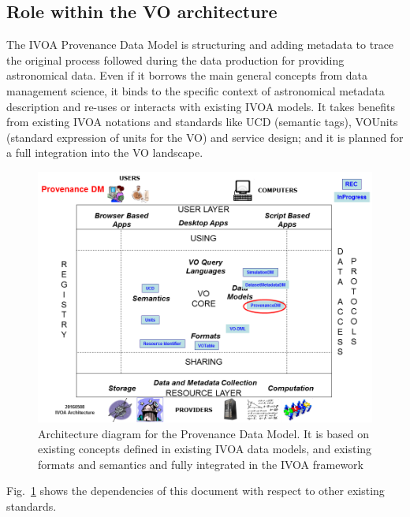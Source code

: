 \subsection{Role within the VO architecture}

The IVOA Provenance Data Model is structuring and adding metadata to trace the original process followed during the data production for providing astronomical data. Even if it borrows the main general concepts from data management science, it binds to the specific context of astronomical metadata description and re-uses or interacts with existing IVOA models. It takes benefits from existing IVOA notations and standards like UCD (semantic tags), VOUnits (standard expression of units for the VO) and service design; and it is planned for a full integration into the VO landscape.

\begin{figure}
\centering
\includegraphics[width=\textwidth]{VOArchitecture-Prov2016.png}
\caption[Architecture diagram for the Provenance Data Model]{Architecture diagram for the Provenance Data Model. It is based on existing concepts defined in existing IVOA data models, and existing formats and semantics and fully integrated in the IVOA framework}
\label{fig:archdiag}
\end{figure}

Fig.~\ref{fig:archdiag} shows the dependencies of this document with respect to other existing standards.
